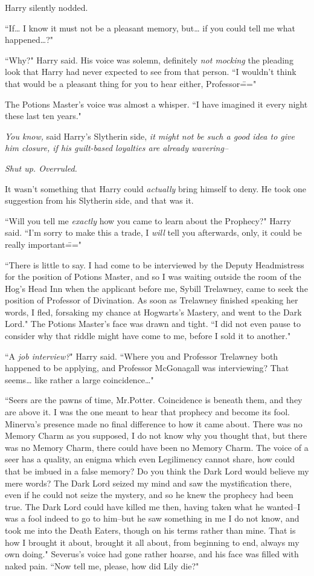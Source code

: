 Harry silently nodded.

``If{\ldots} I know it must not be a pleasant memory, but{\ldots} if you could tell me what happened{\ldots}?"

``Why?" Harry said. His voice was solemn, definitely \emph{not mocking} the pleading look that Harry had never expected to see from that person. ``I wouldn't think that would be a pleasant thing for you to hear either, Professor\==="

The Potions Master's voice was almost a whisper. ``I have imagined it every night these last ten years."

\emph{You know,} said Harry's Slytherin side, \emph{it might not be such a good idea to give him closure, if his guilt-based loyalties are already wavering\---}

\emph{Shut up. Overruled.}

It wasn't something that Harry could \emph{actually} bring himself to deny. He took one suggestion from his Slytherin side, and that was it.

``Will you tell me \emph{exactly} how you came to learn about the Prophecy?" Harry said. ``I'm sorry to make this a trade, I \emph{will} tell you afterwards, only, it could be really important\==="

``There is little to say. I had come to be interviewed by the Deputy Headmistress for the position of Potions Master, and so I was waiting outside the room of the Hog's Head Inn when the applicant before me, Sybill Trelawney, came to seek the position of Professor of Divination. As soon as Trelawney finished speaking her words, I fled, forsaking my chance at Hogwarts's Mastery, and went to the Dark Lord." The Potions Master's face was drawn and tight. ``I did not even pause to consider why that riddle might have come to me, before I sold it to another."

``A \emph{job interview?}" Harry said. ``Where you and Professor Trelawney both happened to be applying, and Professor McGonagall was interviewing? That seems{\ldots} like rather a large coincidence{\ldots}"

``Seers are the pawns of time, Mr.\?Potter. Coincidence is beneath them, and they are above it. I was the one meant to hear that prophecy and become its fool. Minerva's presence made no final difference to how it came about. There was no Memory Charm as you supposed, I do not know why you thought that, but there was no Memory Charm, there could have been no Memory Charm. The voice of a seer has a quality, an enigma which even Legilimency cannot share, how could that be imbued in a false memory? Do you think the Dark Lord would believe my mere words? The Dark Lord seized my mind and saw the mystification there, even if he could not seize the mystery, and so he knew the prophecy had been true. The Dark Lord could have killed me then, having taken what he wanted\---I was a fool indeed to go to him\---but he saw something in me I do not know, and took me into the Death Eaters, though on his terms rather than mine. That is how I brought it about, brought it all about, from beginning to end, always my own doing." Severus's voice had gone rather hoarse, and his face was filled with naked pain. ``Now tell me, please, how did Lily die?"


